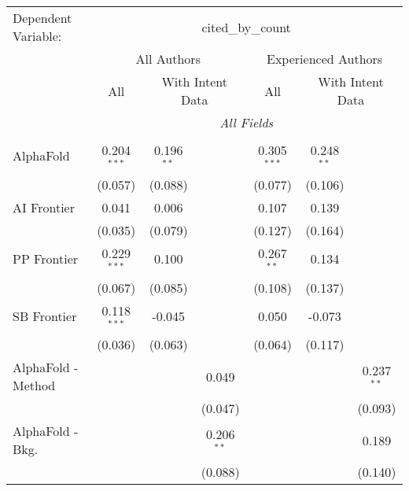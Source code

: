 \begingroup
\centering
\begin{tabular}{lcccccc}
   \tabularnewline \midrule \midrule
   Dependent Variable: & \multicolumn{6}{c}{cited\_by\_count}\\
 & \multicolumn{3}{c}{All Authors} & \multicolumn{3}{c}{Experienced Authors} \\
\cmidrule(lr){2-4} \cmidrule(lr){5-7}
 & \multicolumn{1}{c}{All} & \multicolumn{2}{c}{With Intent Data} & \multicolumn{1}{c}{All} & \multicolumn{2}{c}{With Intent Data} \\
\cmidrule(lr){2-2} \cmidrule(lr){3-4} \cmidrule(lr){5-5} \cmidrule(lr){6-7}
 & \multicolumn{6}{c}{\textit{All Fields}} \\ \\
   AlphaFold                     & 0.204$^{***}$ & 0.196$^{**}$ &                & 0.305$^{***}$ & 0.248$^{**}$ &   \\   
                                 & (0.057)       & (0.088)      &                & (0.077)       & (0.106)      &   \\   
   AI Frontier                   & 0.041         & 0.006        &                & 0.107         & 0.139        &   \\   
                                 & (0.035)       & (0.079)      &                & (0.127)       & (0.164)      &   \\   
   PP Frontier                   & 0.229$^{***}$ & 0.100        &                & 0.267$^{**}$  & 0.134        &   \\   
                                 & (0.067)       & (0.085)      &                & (0.108)       & (0.137)      &   \\   
   SB Frontier                   & 0.118$^{***}$ & -0.045       &                & 0.050         & -0.073       &   \\   
                                 & (0.036)       & (0.063)      &                & (0.064)       & (0.117)      &   \\   
   AlphaFold - Method            &               &              & 0.049          &               &              & 0.237$^{**}$\\   
                                 &               &              & (0.047)        &               &              & (0.093)\\   
   AlphaFold - Bkg.              &               &              & 0.206$^{**}$   &               &              & 0.189\\   
                                 &               &              & (0.088)        &               &              & (0.140)\\   

\end{tabular}
